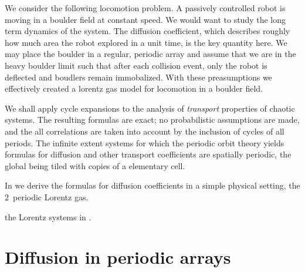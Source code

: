 We consider the following locomotion problem. A passively controlled robot is moving in a boulder field at constant speed. We would want to study the long term dynamics of the system. The diffusion coefficient, which describes roughly how much area the robot explored in a unit time, is the key quantity here. We may place the boulder in a regular, periodic array and assume that we are in the heavy boulder limit such that after each collision event, only the robot is deflected and boudlers remain immobalized. With these preasumptions we effectively created a lorentz gas model for locomotion in a boulder field.

We shall apply cycle expansions to the analysis of {\em transport} properties of
chaotic systems. The resulting formulas are exact; no probabilistic assumptions
are made, and the all correlations are taken into account by the inclusion of
cycles of all periods.  The infinite extent systems for which the periodic orbit
theory yields formulas for diffusion and other transport coefficients are
spatially periodic, the global {\statesp} being tiled with copies of a
elementary cell.

In  we derive the formulas for diffusion
coefficients in a simple physical setting, the $2$\dmn\ periodic Lorentz
gas.

the Lorentz systems in .

\section{Diffusion in periodic arrays}
\label{s-DiffPerArr}

